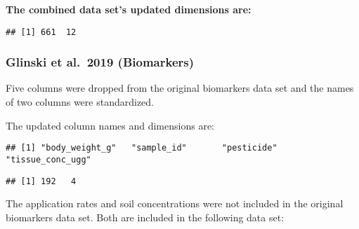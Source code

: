 \documentclass[
]{article}
\newenvironment{Shaded}{\begin{snugshade}}{\end{snugshade}}
\newcommand{\CommentTok}[1]{\textcolor[rgb]{0.56,0.35,0.01}{\textit{#1}}}
\newcommand{\KeywordTok}[1]{\textcolor[rgb]{0.13,0.29,0.53}{\textbf{#1}}}
\newcommand{\NormalTok}[1]{#1}
\newcommand{\OperatorTok}[1]{\textcolor[rgb]{0.81,0.36,0.00}{\textbf{#1}}}
\newcommand{\StringTok}[1]{\textcolor[rgb]{0.31,0.60,0.02}{#1}}
\begin{document}
\textbf{The combined data set's updated dimensions are:}

\begin{verbatim}
## [1] 661  12
\end{verbatim}

\hypertarget{glinski-et-al.-2019-biomarkers-1}{%
\subsubsection{Glinski et al.~2019
(Biomarkers)}\label{glinski-et-al.-2019-biomarkers-1}}

Five columns were dropped from the original biomarkers data set and the
names of two columns were standardized.

\begin{Shaded}
\end{Shaded}

The updated column names and dimensions are:

\begin{verbatim}
## [1] "body_weight_g"   "sample_id"       "pesticide"       "tissue_conc_ugg"
\end{verbatim}

\begin{verbatim}
## [1] 192   4
\end{verbatim}

The application rates and soil concentrations were not included in the
original biomarkers data set. Both are included in the following data
set:
\end{document}
